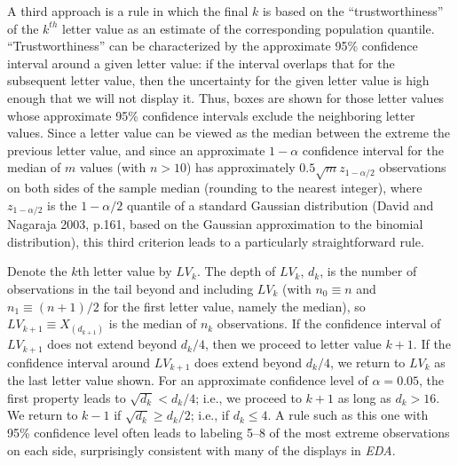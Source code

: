 \documentclass[11pt]{article}
\begin{document}
A third approach is a rule in which the final $k$ is based on 
the ``trustworthiness'' of the $k^{th}$ letter value as an 
estimate of the corresponding population quantile. 
``Trustworthiness'' can be characterized by the %
approximate 95\% confidence interval around a given letter value:
if the interval overlaps that for the subsequent letter value, then 
the uncertainty for the given letter value is high enough that we
will not display it.  Thus, boxes are shown for those
letter values whose approximate 95\% confidence intervals
exclude the neighboring letter values. 
Since a letter value can be viewed as the median between the
extreme the previous letter value, and since an approximate
$1-\alpha$ confidence interval for the median of $m$ values 
(with $n > 10$) has approximately $0.5 \sqrt{m} z_{1-\alpha/2}$ 
observations on both sides of the sample median (rounding to 
the nearest integer), where $z_{1-\alpha/2}$ is the 
${1-\alpha/2}$ quantile of a standard Gaussian distribution 
(David and Nagaraja 2003, p.161, based on the Gaussian
approximation to the binomial distribution), this third
criterion leads to a particularly straightforward rule.

Denote the $k$th letter value by $LV_k$. 
The depth of $LV_k$, $d_k$, is the number of observations in the tail beyond
and including $LV_{k}$ (with $n_0 \equiv n$ and $n_1 \equiv (n+1)/2$ for the
first letter value, namely the median), 
so $LV_{k+1} \equiv X_{(d_{k+1})}$ is the median
of $n_k$ observations.
If the confidence interval of $LV_{k+1}$ does not extend beyond 
$d_k/4$, then we proceed to letter value $k+1$. 
If the confidence interval around $LV_{k+1}$ does extend beyond $d_k/4$, 
we return to $LV_{k}$ as the last letter value shown.
For an approximate confidence level of $\alpha= 0.05$, the first property 
leads to $\sqrt{d_k} < d_k/4$; i.e., we proceed to $k+1$ as long as 
$d_k > 16$. 
We return to $k-1$ if  $\sqrt{d_k} \ge d_k/2$; i.e., if $d_k \le 4$. 
A rule such as this one with 95\% confidence level often leads to
labeling 5--8 of the most extreme observations on each side,
surprisingly consistent with many of the displays in \textit{EDA}.
\end{document}
